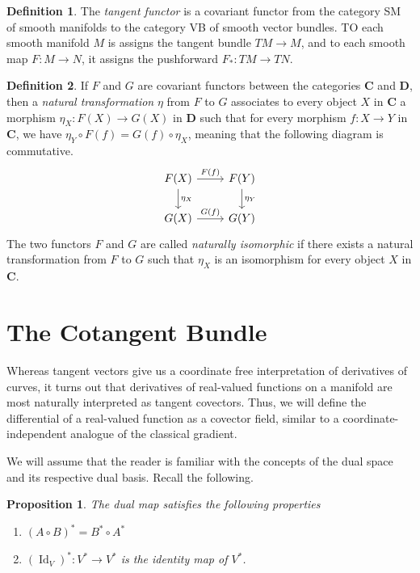 \documentclass{article}
\DeclareMathOperator{\Id}{Id}
\newtheorem{proposition}[theorem]{Proposition}
\theoremstyle{remark}
\theoremstyle{definition}
\newtheorem{definition}{Definition}[section]
\begin{document}
\begin{definition}
The \textit{tangent functor} is a covariant functor from the category SM of smooth manifolds to the category VB of smooth vector bundles. TO each smooth manifold $M$ is assigns the tangent bundle $TM \rightarrow M$, and to each smooth map $F: M \longrightarrow N$, it assigns the pushforward $F_* : TM \longrightarrow TN$.
\end{definition}

\begin{definition}
If $F$ and $G$ are covariant functors between the categories $\mathbf{C}$ and $\mathbf{D}$, then a \textit{natural transformation} $\eta$ from $F$ to $G$ associates to every object $X$ in $\mathbf{C}$ a morphism $\eta_X: F(X) \longrightarrow G(X)$ in $\mathbf{D}$ such that for every morphism $f: X \longrightarrow Y$ in $\mathbf{C}$, we have $\eta_Y \circ F(f) = G(f) \circ \eta_X$, meaning that the following diagram is commutative. 
\[\begin{tikzcd}
F(X) \arrow{r}{F(f)} \arrow{d}{\eta_X} & F(Y) \arrow{d}{\eta_Y} \\
G(X) \arrow{r}{G(f)} & G(Y)
\end{tikzcd}\]
The two functors $F$ and $G$ are called \textit{naturally isomorphic} if there exists a natural transformation from $F$ to $G$ such that $\eta_X$ is an isomorphism for every object $X$ in $\mathbf{C}$. 
\end{definition}

\section{The Cotangent Bundle}
Whereas tangent vectors give us a coordinate free interpretation of derivatives of curves, it turns out that derivatives of real-valued functions on a manifold are most naturally interpreted as tangent covectors. Thus, we will define the differential of a real-valued function as a covector field, similar to a coordinate-independent analogue of the classical gradient. 

We will assume that the reader is familiar with the concepts of the dual space and its respective dual basis. Recall the following. 

\begin{proposition}
The dual map satisfies the following properties 
\begin{enumerate}
    \item $(A \circ B)^* = B^* \circ A^*$
    \item $(\Id_V)^*: V^* \longrightarrow V^*$ is the identity map of $V^*$. 
\end{enumerate}
\end{proposition}
\end{document}
